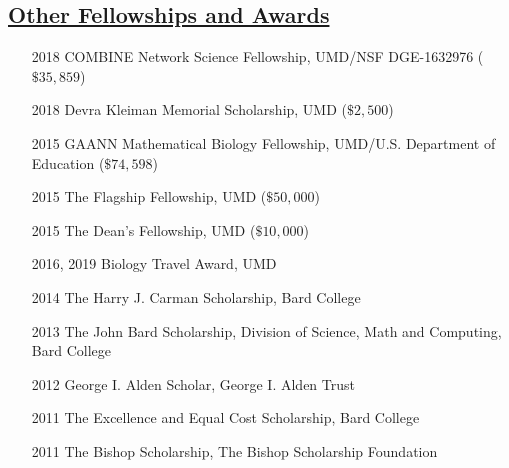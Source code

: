 \documentclass[]{res}
\begin{document}
\begin{resume}
   \section{\underline{Other Fellowships and Awards}} %
\begin{itemize}
\item[2018] COMBINE Network Science Fellowship, UMD/NSF DGE-1632976 ($\$35,859$)
\item[2018] Devra Kleiman Memorial Scholarship, UMD ($\$2,500$)
\item[2015] GAANN Mathematical Biology Fellowship, UMD/U.S. Department of Education ($\$74,598$)
\item[2015] The Flagship Fellowship, UMD ($\$50,000$)
\item[2015] The Dean's Fellowship, UMD ($\$10,000$)
\item[2016, 2019] Biology Travel Award, UMD
\item[2014] The Harry J. Carman Scholarship, Bard College
\item[2013] The John Bard Scholarship, Division of Science, Math and Computing, Bard College
\item[2012] George I. Alden Scholar, George I. Alden Trust
\item[2011] The Excellence and Equal Cost Scholarship, Bard College
\item[2011] The Bishop Scholarship, The Bishop Scholarship Foundation
\end{itemize}

  

\end{resume}
\end{document}
